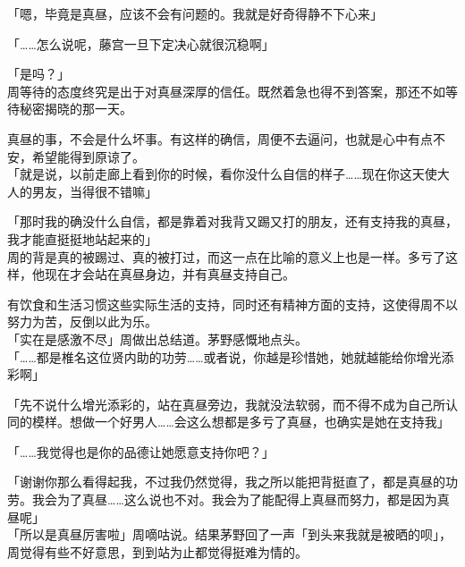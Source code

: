「嗯，毕竟是真昼，应该不会有问题的。我就是好奇得静不下心来」

「……怎么说呢，藤宫一旦下定决心就很沉稳啊」

「是吗？」\\

周等待的态度终究是出于对真昼深厚的信任。既然着急也得不到答案，那还不如等待秘密揭晓的那一天。

真昼的事，不会是什么坏事。有这样的确信，周便不去逼问，也就是心中有点不安，希望能得到原谅了。\\

「就是说，以前走廊上看到你的时候，看你没什么自信的样子……现在你这天使大人的男友，当得很不错嘛」

「那时我的确没什么自信，都是靠着对我背又踢又打的朋友，还有支持我的真昼，我才能直挺挺地站起来的」\\

周的背是真的被踢过、真的被打过，而这一点在比喻的意义上也是一样。多亏了这样，他现在才会站在真昼身边，并有真昼支持自己。

有饮食和生活习惯这些实际生活的支持，同时还有精神方面的支持，这使得周不以努力为苦，反倒以此为乐。\\

「实在是感激不尽」周做出总结道。茅野感慨地点头。\\

「……都是椎名这位贤内助的功劳……或者说，你越是珍惜她，她就越能给你增光添彩啊」

「先不说什么增光添彩的，站在真昼旁边，我就没法软弱，而不得不成为自己所认同的模样。想做一个好男人……会这么想都是多亏了真昼，也确实是她在支持我」

「……我觉得也是你的品德让她愿意支持你吧？」

「谢谢你那么看得起我，不过我仍然觉得，我之所以能把背挺直了，都是真昼的功劳。我会为了真昼……这么说也不对。我会为了能配得上真昼而努力，都是因为真昼呢」\\

「所以是真昼厉害啦」周嘀咕说。结果茅野回了一声「到头来我就是被晒的呗」，周觉得有些不好意思，到到站为止都觉得挺难为情的。
